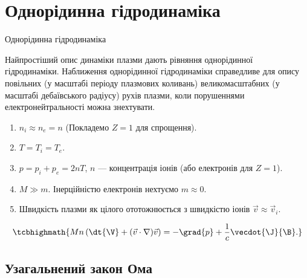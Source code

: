 \documentclass[]{beamer}
\begin{document}
\section{Однорідинна гідродинаміка}

\begin{frame}{Однорідинна гідродинаміка}{}
	\begin{block}{}\justifying
		Найпростіший опис динаміки плазми дають рівняння однорідинної гідродинаміки. Наближення однорідинної гідродинаміки справедливе для опису \alert{повільних} (у масштабі періоду плазмових коливань) \alert{великомасштабних} (у масштабі дебаївського радіусу) рухів плазми, \alert{коли порушеннями електронейтральності можна знехтувати}.
		\begin{enumerate}
			\item $n_i \approx n_e = n$ (Покладемо $Z = 1$ для спрощення).
			\item $T = T_i = T_e$.
			\item $p = p_i + p_e = 2 n T$, $n$ --- концентрація іонів (або електронів для $Z = 1$).
			\item $M \gg m$. Інерційністю електронів нехтуємо $m \approx 0$.
			\item Швидкість плазми як цілого ототожнюється з швидкістю іонів $\vec{v} \approx \vec{v}_i$.
		\end{enumerate}
	\end{block}
	\begin{equation*}
		\tcbhighmath{
			Mn\left(\dt{\V} + (\vec{v}\cdot\nabla)\vec{v} \right) = - \grad{p} + \frac1c\vecdot{\J}{\B}.
		}
	\end{equation*}
\end{frame}

\subsection{Узагальнений закон Ома}
\end{document}
